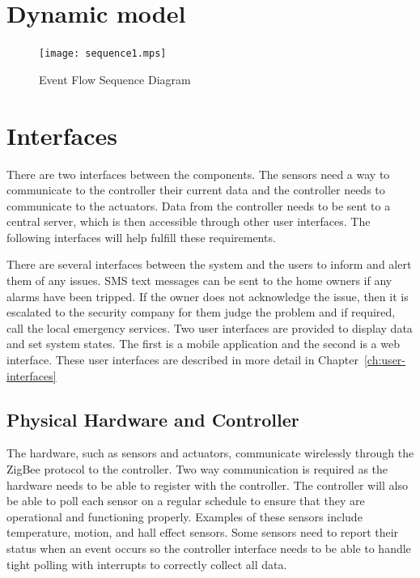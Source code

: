 \documentclass{report}
\begin{document}

\section{Dynamic model}

\begin{landscape}
\begin{figure}[hp]
    \centering
        \caption{Event Flow Sequence Diagram}
        \scriptsize
        \setlength{\unitlength}{2.0em}
        \texttt{[image: sequence1.mps]}
        \normalsize
    \label{fig:event_flow_sequence_diagram}
\end{figure}
\end{landscape}


\section{Interfaces}
There are two interfaces between the components. The sensors need a way to
communicate to the controller their current data and the controller needs to
communicate to the actuators. Data from the controller needs to be sent to a
central server, which is then accessible through other user interfaces. The following
interfaces will help fulfill these requirements.

There are several interfaces between the system and the users to inform and
alert them of any issues. SMS text messages can be sent to the home owners if
any alarms have been tripped. If the owner does not acknowledge the issue, then
it is escalated to the security company for them judge the problem and if required,
call the local emergency services. Two user interfaces are provided to display
data and set system states. The first is a mobile application and the second is
a web interface. These user interfaces are described in more detail in
Chapter~\ref{ch:user-interfaces}

\subsection{Physical Hardware and Controller}
The hardware, such as sensors and actuators, communicate wirelessly through the
ZigBee protocol to the controller. Two way communication is required as the
hardware needs to be able to register with the controller. The controller will
also be able to poll each sensor on a regular schedule to ensure that they are
operational and functioning properly. Examples of these sensors include
temperature, motion, and hall effect sensors. Some sensors need to report their
status when an event occurs so the controller interface needs to be able to
handle tight polling with interrupts to correctly collect all data.
\end{document}
